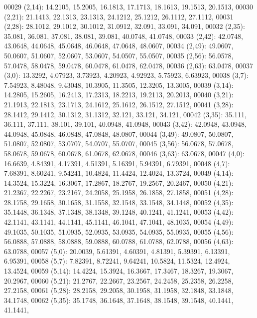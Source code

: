\begin{DoxyCode}
00029       (2,14): 14.2105, 15.2005, 16.1813, 17.1713, 18.1613, 19.1513, 20.1513,
00030       (2,21): 21.1413, 22.1313, 23.1313, 24.1212, 25.1212, 26.1112, 27.1112,
00031       (2,28): 28.1012, 29.1012, 30.1012, 31.0912, 32.091, 33.091, 34.091,
00032       (2,35): 35.081, 36.081, 37.081, 38.081, 39.081, 40.0748, 41.0748,
00033       (2,42): 42.0748, 43.0648, 44.0648, 45.0648, 46.0648, 47.0648, 48.0607,
00034       (2,49): 49.0607, 50.0607, 51.0607, 52.0607, 53.0607, 54.0507, 55.0507,
00035       (2,56): 56.0578, 57.0478, 58.0478, 59.0478, 60.0478, 61.0478, 62.0478,
00036       (2,63): 63.0478,
00037       (3,0): 13.3292, 4.07923, 3.73923, 4.20923, 4.92923, 5.75923, 6.63923,
00038       (3,7): 7.54923, 8.48048, 9.43048, 10.3905, 11.3505, 12.3205, 13.3005,
00039       (3,14): 14.2805, 15.2605, 16.2413, 17.2313, 18.2213, 19.2113, 20.2013,
00040       (3,21): 21.1913, 22.1813, 23.1713, 24.1612, 25.1612, 26.1512, 27.1512,
00041       (3,28): 28.1412, 29.1412, 30.1312, 31.1312, 32.121, 33.121, 34.121,
00042       (3,35): 35.111, 36.111, 37.111, 38.101, 39.101, 40.0948, 41.0948,
00043       (3,42): 42.0948, 43.0948, 44.0948, 45.0848, 46.0848, 47.0848, 48.0807,
00044       (3,49): 49.0807, 50.0807, 51.0807, 52.0807, 53.0707, 54.0707, 55.0707,
00045       (3,56): 56.0678, 57.0678, 58.0678, 59.0678, 60.0678, 61.0678, 62.0678,
00046       (3,63): 63.0678,
00047       (4,0): 16.6639, 4.84391, 4.17391, 4.51391, 5.16391, 5.94391, 6.79391,
00048       (4,7): 7.68391, 8.60241, 9.54241, 10.4824, 11.4424, 12.4024, 13.3724,
00049       (4,14): 14.3524, 15.3224, 16.3067, 17.2867, 18.2767, 19.2567, 20.2467,
00050       (4,21): 21.2367, 22.2267, 23.2167, 24.2058, 25.1958, 26.1858, 27.1858,
00051       (4,28): 28.1758, 29.1658, 30.1658, 31.1558, 32.1548, 33.1548, 34.1448,
00052       (4,35): 35.1448, 36.1348, 37.1348, 38.1348, 39.1248, 40.1241, 41.1241,
00053       (4,42): 42.1141, 43.1141, 44.1141, 45.1141, 46.1041, 47.1041, 48.1035,
00054       (4,49): 49.1035, 50.1035, 51.0935, 52.0935, 53.0935, 54.0935, 55.0935,
00055       (4,56): 56.0888, 57.0888, 58.0888, 59.0888, 60.0788, 61.0788, 62.0788,
00056       (4,63): 63.0788,
00057       (5,0): 20.0039, 5.61391, 4.60391, 4.81391, 5.39391, 6.13391, 6.95391,
00058       (5,7): 7.82391, 8.72241, 9.64241, 10.5824, 11.5324, 12.4924, 13.4524,
00059       (5,14): 14.4224, 15.3924, 16.3667, 17.3467, 18.3267, 19.3067, 20.2967,
00060       (5,21): 21.2767, 22.2667, 23.2567, 24.2458, 25.2358, 26.2258, 27.2158,
00061       (5,28): 28.2158, 29.2058, 30.1958, 31.1958, 32.1848, 33.1848, 34.1748,
00062       (5,35): 35.1748, 36.1648, 37.1648, 38.1548, 39.1548, 40.1441, 41.1441,

\end{DoxyCode}
